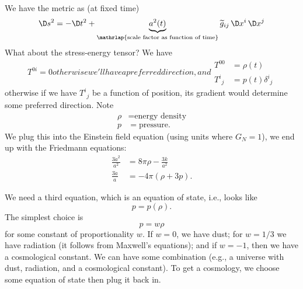 We have the metric as (at fixed time)
\begin{equation}
\D s^{2}=-\D t^{2}+\underbrace{a^{2}(t)}_{\mathrlap{\text{scale
      factor as function of time}}}\widetilde{g}_{ij}\,\D
x^{i}\,\D x^{j}
\end{equation}
What about the stress-energy tensor? We have
\begin{subequations}
\begin{equation}
T^{0i}=0
\end{equation}
otherwise we'll have a preferred direction, and
\begin{align}
T^{00} &=\rho(t)\\
{T^{i}}_{j} &= p(t){\delta^{i}}_{j}
\end{align}
\end{subequations}
otherwise if we have ${T^{i}}_{j}$ be a function of position, its
gradient would determine some preferred direction. Note
\begin{align*}
\rho&=\mbox{energy density}\\
p&=\mbox{pressure}.
\end{align*}
We plug this into the Einstein field equation (using units where
$G_{N}=1$), we end up with the Friedmann equations: 
\begin{subequations}\label{eq:friedmann}
\begin{align}
\frac{3\dot{a}^{2}}{a^{2}} &= 8\pi\rho-\frac{3k}{a^{2}}\\
\frac{3\ddot{a}}{a} &= -4\pi(\rho+3p).
\end{align}
\end{subequations}

We need a third equation, which is an equation of state, i.e.,
looks like
\begin{equation}
p=p(\rho).
\end{equation}
The simplest choice is
\begin{equation}
p=w\rho
\end{equation}
for some constant of proportionality $w$. If $w=0$, we have dust;
for $w=1/3$ we have radiation (it follows from Maxwell's
equations); and if $w=-1$, then we have a cosmological
constant. We can have some combination (e.g., a universe with
dust, radiation, and a cosmological constant). To get a
cosmology, we choose some equation of state then plug it back
in. 

